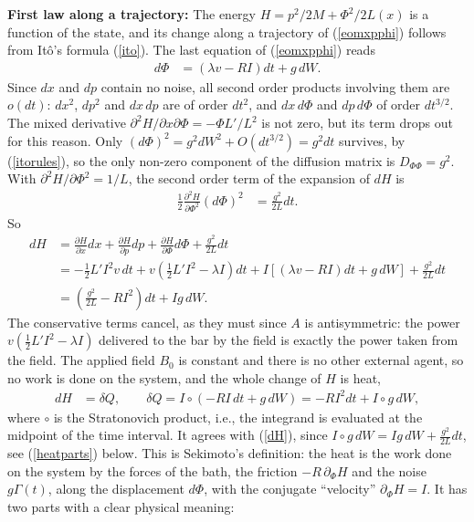 \documentclass[11pt]{article}
\begin{document}
{\bf First law along a trajectory:} The energy $H=p^2/2M+\Phi^2/2L(x)$ is a function of the state, and its change along a trajectory of (\ref{eomxpphi}) follows from It\^o's formula (\ref{ito}). The last equation of (\ref{eomxpphi}) reads
\begin{align}
  d\Phi&=\left(\lambda v-RI\right)dt+g\,dW.
\end{align}
Since $dx$ and $dp$ contain no noise, all second order products involving them are $o(dt)$: $dx^2$, $dp^2$ and $dx\,dp$ are of order $dt^2$, and $dx\,d\Phi$ and $dp\,d\Phi$ of order $dt^{3/2}$. The mixed derivative $\partial^2H/\partial x\partial\Phi=-\Phi L'/L^2$ is not zero, but its term drops out for this reason. Only $(d\Phi)^2=g^2dW^2+O(dt^{3/2})=g^2dt$ survives, by (\ref{itorules}), so the only non-zero component of the diffusion matrix is $D_{\Phi\Phi}=g^2$. With $\partial^2H/\partial\Phi^2=1/L$, the second order term of the expansion of $dH$ is
\begin{align}
  \frac{1}{2}\frac{\partial^2H}{\partial\Phi^2}(d\Phi)^2&=\frac{g^2}{2L}dt.
\end{align}
So
\begin{align}
  dH&=\frac{\partial H}{\partial x}dx+\frac{\partial H}{\partial p}dp+\frac{\partial H}{\partial\Phi}d\Phi+\frac{g^2}{2L}dt\nonumber\\
  &=-\frac{1}{2}L'I^2v\,dt+v\left(\frac{1}{2}L'I^2-\lambda I\right)dt+I\left[(\lambda v-RI)dt+g\,dW\right]+\frac{g^2}{2L}dt\nonumber\\
  &=\left(\frac{g^2}{2L}-RI^2\right)dt+Ig\,dW.
  \label{dH}
\end{align}
The conservative terms cancel, as they must since $A$ is antisymmetric: the power $v(\frac{1}{2}L'I^2-\lambda I)$ delivered to the bar by the field is exactly the power taken from the field. The applied field $B_0$ is constant and there is no other external agent, so no work is done on the system, and the whole change of $H$ is heat,
\begin{align}
  dH&=\delta Q,\qquad\delta Q=I\circ\left(-RI\,dt+g\,dW\right)=-RI^2dt+I\circ g\,dW,
  \label{firstlaw}
\end{align}
where $\circ$ is the Stratonovich product, i.e., the integrand is evaluated at the midpoint of the time interval. It agrees with (\ref{dH}), since $I\circ g\,dW=Ig\,dW+\frac{g^2}{2L}dt$, see (\ref{heatparts}) below. This is Sekimoto's definition: the heat is the work done on the system by the forces of the bath, the friction $-R\,\partial_\Phi H$ and the noise $g\Gamma(t)$, along the displacement $d\Phi$, with the conjugate ``velocity'' $\partial_\Phi H=I$. It has two parts with a clear physical meaning:
\end{document}

